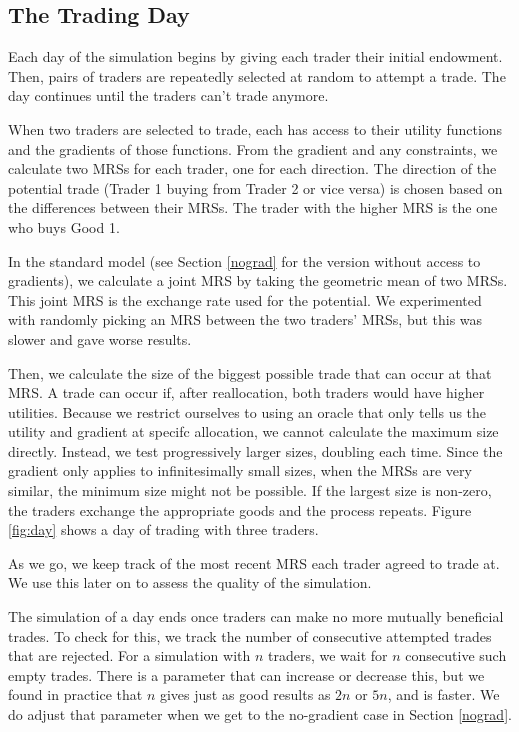 \documentclass[12pt,a4paper,titlepage]{article}
\begin{document}
\subsection{The Trading Day}

Each day of the simulation begins by giving each trader their initial endowment.
Then, pairs of traders are repeatedly selected at random to attempt a trade.
The day continues until the traders can't trade anymore.

When two traders are selected to trade, each has access to their utility functions and the gradients of those functions.
From the gradient and any constraints, we calculate two MRSs for each trader, one for each direction.
The direction of the potential trade (Trader 1 buying from Trader 2 or vice versa) is chosen based on the differences between their MRSs.
The trader with the higher MRS is the one who buys Good 1.

In the standard model (see Section \ref{nograd} for the version without access to gradients), we calculate a joint MRS by taking the geometric mean of two MRSs.
This joint MRS is the exchange rate used for the potential.
We experimented with randomly picking an MRS between the two traders' MRSs, but this was slower and gave worse results.

Then, we calculate the size of the biggest possible trade that can occur at that MRS.
A trade can occur if, after reallocation, both traders would have higher utilities.
Because we restrict ourselves to using an oracle that only tells us the utility and gradient at specifc allocation, we cannot calculate the maximum size directly.
Instead, we test progressively larger sizes, doubling each time.
Since the gradient only applies to infinitesimally small sizes, when the MRSs are very similar, the minimum size might not be possible.
If the largest size is non-zero, the traders exchange the appropriate goods and the process repeats.
Figure \ref{fig:day} shows a day of trading with three traders.

As we go, we keep track of the most recent MRS each trader agreed to trade at.
We use this later on to assess the quality of the simulation.

The simulation of a day ends once traders can make no more mutually beneficial trades.
To check for this, we track the number of consecutive attempted trades that are rejected. 
For a simulation with $n$ traders, we wait for $n$ consecutive such empty trades.
There is a parameter that can increase or decrease this, but we found in practice that $n$ gives just as good results as $2n$ or $5n$, and is faster.
We do adjust that parameter when we get to the no-gradient case in Section \ref{nograd}.
\end{document}
